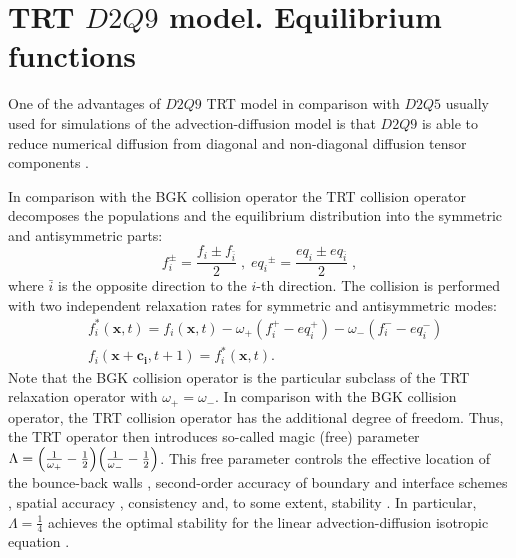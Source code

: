 \documentclass{article}
\begin{document}
\section{TRT $D2Q9$ model. Equilibrium functions}
One of the advantages of $D2Q9$ TRT model in comparison with $D2Q5$ usually used for simulations of
the advection-diffusion model is that $D2Q9$ is able to reduce numerical diffusion from diagonal
and non-diagonal diffusion tensor components \cite{kuzmin-stability-optimal}.

In
comparison with the BGK collision operator the TRT collision operator \cite{ginzburg-boundary-main}
decomposes the populations and the equilibrium
distribution into the symmetric and antisymmetric parts:
\begin{equation}
\label{trtdecomp}
f^{\pm}_i=\frac{f_i\pm f_{\bar{i}}}{2}\;,\; 
{eq_i}^{\pm}=\frac{eq_i\pm eq_{\bar{i}}}{2}\;,
\end{equation}
where $\bar{i}$ is the opposite direction to the $i$-th direction.
The collision is performed with two independent relaxation rates for 
symmetric and antisymmetric modes:
\begin{equation}
\label{trt}
\begin{aligned}
&f_i^{*}(\bm{x},t)=f_i(\bm{x},t)-\omega_{+} (f_i^{+} - eq_i^+)-\omega_{-}
(f_i^{-} -
eq_i^-)\\
&f_i(\bm{x}+\bm{c_i},t+1)=f_i^{*}(\bm{x},t).
\end{aligned}
\end{equation}
Note that the BGK collision operator is the particular subclass of the TRT relaxation operator with
$\omega_{+}=\omega_{-}$. In comparison with the BGK collision operator,
the TRT collision operator has the additional degree of freedom. Thus, the TRT operator then
introduces
so-called magic (free) parameter
$\Lambda=\Bigl(\frac{1}{\omega_{+}}-\frac{1}{2}\Bigr)\Bigl(\frac{1}{\omega_{-}}-\frac{1}{2}\Bigr)$. 
This free parameter controls the effective location of the bounce-back
walls \cite{ginzburg-multireflection}, second-order accuracy of
boundary \cite{ginzburg-boundary-main} and interface schemes \cite{ginzburg-discontinious}, 
spatial accuracy \cite{ginzburg-recurrence,servan-trt-stability},
consistency \cite{ginzburg-brinkman} and, to some extent,
stability \cite{kuzmin-stability-optimal,kuzmin-d1q3,servan-trt-stability}.
In particular, $\Lambda=\frac{1}{4}$ achieves the optimal stability for the
linear advection-diffusion isotropic equation \cite{kuzmin-stability-optimal}. 
\end{document}
